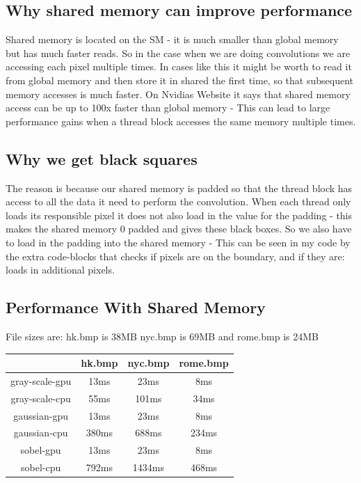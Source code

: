 \documentclass{article}
\begin{document}
\subsection{Why shared memory can improve performance}%
\label{sub:why_shared_memory_can_improve_performance}

Shared memory is located on the SM - it is much smaller than global memory but has much faster reads. So in the case when we are doing convolutions we are accessing each
pixel multiple times. In cases like this it might be worth to read it from global memory and then store it in shared the first time, so that subsequent memory accesses is much faster. On 
Nvidias Website it says that shared memory access can be up to 100x faster than global memory - This can lead to large performance gains when a thread block accesses the same memory multiple times.

\subsection{Why we get black squares}%

The reason is because our shared memory is padded so that the thread block has access to all the data it need to perform the convolution. When each thread only loads its responsible pixel it does not also load in 
the value for the padding - this makes the shared memory 0 padded and gives these black boxes. So we also have to load in the padding into the shared memory - This can be seen in my code by the extra code-blocks that
checks if pixels are on the boundary, and if they are: loads in additional pixels.

\subsection{Performance With Shared Memory}%
\label{sub:}

File sizes are: hk.bmp is 38MB nyc.bmp is 69MB and rome.bmp is 24MB


\begin{center}
  \begin{tabular}{ | c | c | c | c | }
    \hline
           & hk.bmp & nyc.bmp & rome.bmp\\ \hline
           gray-scale-gpu & 13ms & 23ms & 8ms\\ \hline
           gray-scale-cpu & 55ms & 101ms & 34ms\\ \hline
            gaussian-gpu & 13ms & 23ms & 8ms\\ \hline
           gaussian-cpu & 380ms & 688ms & 234ms \\ \hline
            sobel-gpu & 13ms & 23ms & 8ms \\  \hline
            sobel-cpu & 792ms & 1434ms & 468ms \\  \hline
    \hline
  \end{tabular}
\end{center}
\end{document}
